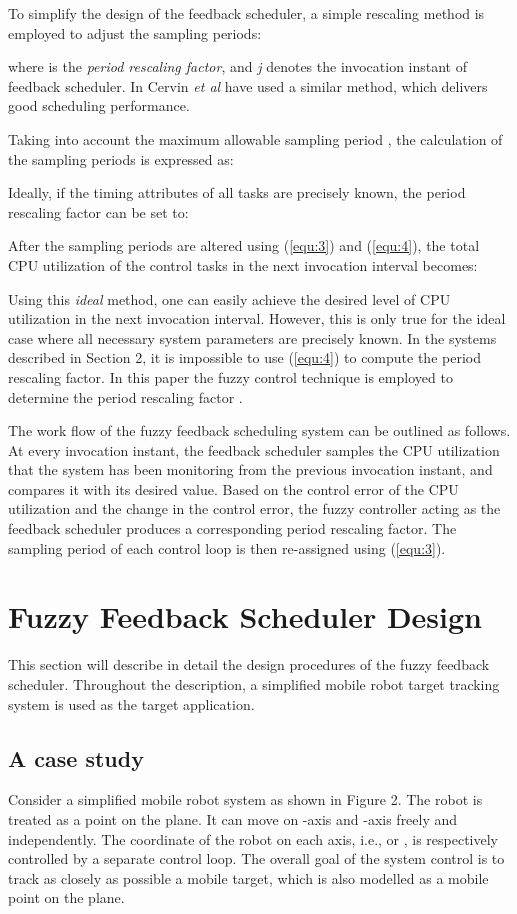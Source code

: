 \documentclass[12pt,a4paper]{ijicic}
\begin{document}
To simplify the design of the feedback scheduler, a simple
rescaling method is employed to adjust the sampling periods:

where   is the \emph{period rescaling factor}, and \emph{j}
denotes the invocation instant of feedback scheduler. In \cite{R6} Cervin
\emph{et al} have used a similar method, which delivers good scheduling performance.

Taking into account the maximum allowable sampling period
, the calculation of the sampling periods is expressed as:


Ideally, if the timing attributes of all tasks are precisely known,
the period rescaling factor can be set to:


After the sampling periods are altered using (\ref{equ:3}) and
(\ref{equ:4}), the total CPU utilization of the control tasks in the
next invocation interval becomes:


Using this \emph{ideal} method, one can easily achieve the desired
level of CPU utilization in the next invocation interval. However,
this is only true for the ideal case where all necessary system
parameters are precisely known. In the systems described in Section
2, it is impossible to use (\ref{equ:4}) to compute the period
rescaling factor. In this paper the fuzzy control technique is
employed to determine the period rescaling factor .

The work flow of the fuzzy feedback scheduling system can be
outlined as follows. At every invocation instant, the feedback
scheduler samples the CPU utilization that the system has been
monitoring from the previous invocation instant, and compares it
with its desired value. Based on the control error of the CPU
utilization and the change in the control error, the fuzzy controller acting as
the feedback scheduler produces a corresponding period rescaling
factor. The sampling period of each control loop is then re-assigned
using (\ref{equ:3}).

\section{Fuzzy Feedback Scheduler Design}
\label{sec:4}

This section will describe in detail the
design procedures of the fuzzy feedback scheduler. Throughout the
description, a simplified mobile robot target tracking system is
used as the target application.

\subsection{A case study}Consider a simplified mobile robot system \cite{R21}
as shown in Figure 2. The robot is treated as a point  on
the plane. It can move on -axis and -axis freely and
independently. The coordinate of the robot on each axis, i.e., 
or , is respectively controlled by a separate control loop. The
overall goal of the system control is to track as closely as
possible a mobile target, which is also modelled as a mobile point
on the plane.
\end{document}
